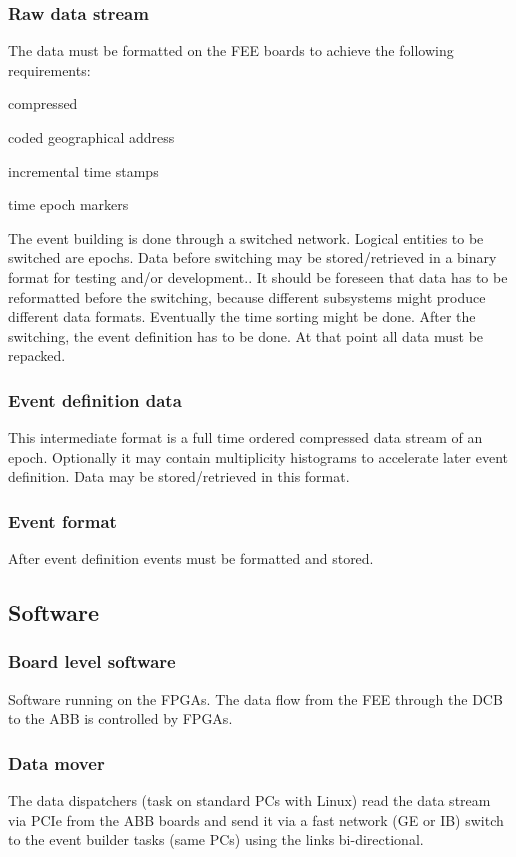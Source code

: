 \subsubsection{Raw data stream}
The data must be formatted on the FEE boards to achieve the following requirements:
\begin{compactenum}
\item compressed
\item coded geographical address
\item incremental time stamps
\item time epoch markers
\end{compactenum}
The event building is done through a switched network.
Logical entities to be switched are epochs.
Data before switching may be stored/retrieved in a binary format for testing and/or
development..
It should be foreseen that data has to be reformatted before the switching, because different
subsystems might produce different data formats. Eventually the time sorting might be done.
After the switching, the event definition has to be done.
At that point all data must be repacked.
\subsubsection{Event definition data}
This intermediate format is a full time ordered compressed data stream of an epoch.
Optionally it may contain multiplicity histograms to accelerate later event definition.
Data may be stored/retrieved in this format.
\subsubsection{Event format}
After event definition events must be formatted and stored.

\subsection{Software}
\subsubsection{Board level software}
Software running on the FPGAs. The data flow from the FEE through
the DCB to the ABB is controlled by FPGAs.
\subsubsection{Data mover}
The data dispatchers (task on standard PCs with Linux) read the
data stream via PCIe from the ABB boards and send it via a fast
network (GE or IB) switch to the event builder tasks (same PCs)
using the links bi-directional.
